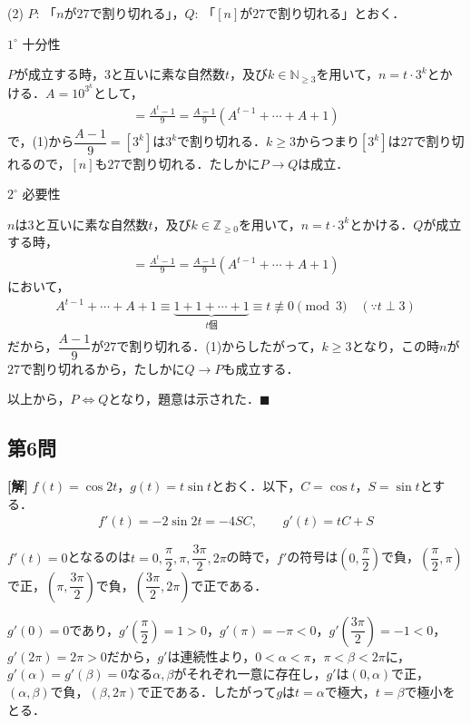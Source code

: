 \documentclass[../main.tex]{subfiles}
\begin{document}
(2) $P$: 「$n$が$27$で割り切れる」，$Q$: 「$[n]$が$27$で割り切れる」とおく．

$1^\circ$ 十分性

$P$が成立する時，$3$と互いに素な自然数$t$，及び$k\in\mathbb N_{\ge3}$を用いて，$n=t\cdot3^k$とかける．$A=10^{3^k}$として，
\begin{align*}
  [n]=\frac{A^t-1}9=\frac{A-1}9(A^{t-1}+\cdots+A+1)
\end{align*}
で，(1)から$\dfrac{A-1}9=[3^k]$は$3^k$で割り切れる．$k\ge3$からつまり$[3^k]$は$27$で割り切れるので，$[n]$も$27$で割り切れる．たしかに$P\to Q$は成立．

$2^\circ$ 必要性

$n$は$3$と互いに素な自然数$t$，及び$k\in\mathbb Z_{\ge0}$を用いて，$n=t\cdot3^k$とかける．$Q$が成立する時，
\begin{align*}
  [n]=\frac{A^t-1}9=\frac{A-1}9(A^{t-1}+\cdots+A+1)
\end{align*}
において，
\begin{align*}
  A^{t-1}+\cdots+A+1\equiv\underbrace{1+1+\cdots+1}_{t個}\equiv t\not\equiv0\pmod3\quad(\because t\perp3)
\end{align*}
だから，$\dfrac{A-1}9$が$27$で割り切れる．(1)からしたがって，$k\ge3$となり，この時$n$が$27$で割り切れるから，たしかに$Q\to P$も成立する．

以上から，$P\iff Q$となり，題意は示された．$\blacksquare$

\bigskip

\subsection*{第6問}

\noindent
{\bf [解]}
$f(t)=\cos2t$，$g(t)=t\sin t$とおく．以下，$C=\cos t$，$S=\sin t$とする．
\begin{align*}
  f'(t)=-2\sin2t=-4SC,\qquad g'(t)=tC+S
\end{align*}

$f'(t)=0$となるのは$t=0,\dfrac\pi2,\pi,\dfrac{3\pi}2,2\pi$の時で，$f'$の符号は$\left(0,\dfrac\pi2\right)$で負，$\left(\dfrac\pi2,\pi\right)$で正，$\left(\pi,\dfrac{3\pi}2\right)$で負，$\left(\dfrac{3\pi}2,2\pi\right)$で正である．

$g'(0)=0$であり，$g'\left(\dfrac\pi2\right)=1>0$，$g'(\pi)=-\pi<0$，$g'\left(\dfrac{3\pi}2\right)=-1<0$，$g'(2\pi)=2\pi>0$だから，$g'$は連続性より，$0<\alpha<\pi$，$\pi<\beta<2\pi$に，$g'(\alpha)=g'(\beta)=0$なる$\alpha,\beta$がそれぞれ一意に存在し，$g'$は$(0,\alpha)$で正，$(\alpha,\beta)$で負，$(\beta,2\pi)$で正である．したがって$g$は$t=\alpha$で極大，$t=\beta$で極小をとる．
\end{document}
